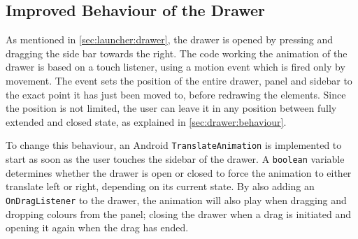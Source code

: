 \subsection{Improved Behaviour of the Drawer}\label{sec:developments:drawerimprovements}
As mentioned in \cref{sec:launcher:drawer}, the drawer is opened by pressing and dragging the side bar towards the right.
The code working the animation of the drawer is based on a touch listener, using a motion event which is fired only by movement.
The event sets the position of the entire drawer, panel and sidebar to the exact point it has just been moved to, before redrawing the elements.
Since the position is not limited, the user can leave it in any position between fully extended and closed state, as explained in \cref{sec:drawer:behaviour}.

To change this behaviour, an Android \lstinline{TranslateAnimation} is implemented to start as soon as the user touches the sidebar of the drawer.
A \lstinline{boolean} variable determines whether the drawer is open or closed to force the animation to either translate left or right, depending on its current state.
By also adding an \lstinline{OnDragListener} to the drawer, the animation will also play when dragging and dropping colours from the panel; closing the drawer when a drag is initiated and opening it again when the drag has ended.